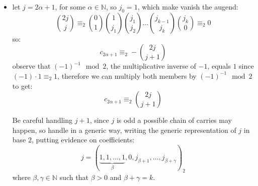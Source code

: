 \documentclass[11pt,a4paper]{article} %
\begin{document}
\begin{itemize}
        \item let $j=2\alpha+1$, for some $\alpha\in\mathbb{N}$, so $j_{0}=1$,
            which make vanish the augend:
            \begin{displaymath}
                {{2j}\choose{j}}
                \equiv_{2} {{0}\choose{1}}{{1}\choose{j_{1}}}{{j_{1}}\choose{j_{2}}}
                    \ldots{{j_{k-1}}\choose{j_{k}}}{{j_{k}}\choose{0}}\equiv_{2}0
            \end{displaymath}
            so:
            \begin{displaymath}
                c_{2\alpha+1}\equiv_{2}-{{2j}\choose{j+1}}
            \end{displaymath}
            observe that $(-1)^{-1}\mod2$, the multiplicative inverse of $-1$, equals $1$
            since $(-1)\cdot 1 \equiv_{2}1$, therefore we can multiply both members by
            $(-1)^{-1}\mod2$ to get:
            \begin{displaymath}
                c_{2\alpha+1}\equiv_{2}{{2j}\choose{j+1}}
            \end{displaymath}

            Be careful handling $j+1$, since $j$ is odd a possible chain of carries
            may happen, so handle in a generic way, writing
            the generic representation of $j$ in base $2$, putting evidence on coefficients:
            \begin{displaymath}
                j=\left(\underbrace{1,1,\ldots,1}_{\beta},0,j_{\beta+1},\ldots,j_{\beta+\gamma}\right)_{2}
            \end{displaymath}
            where $\beta,\gamma\in\mathbb{N}$ such that $\beta>0$ and $\beta+\gamma=k$. 
            

\end{itemize}
\end{document}
